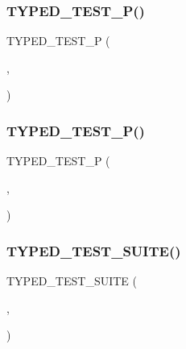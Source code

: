 \subsubsection{\texorpdfstring{TYPED\_TEST\_P()}{TYPED\_TEST\_P()}\hspace{0.1cm}{\footnotesize\ttfamily [1/2]}}
{\footnotesize\ttfamily T\+Y\+P\+E\+D\+\_\+\+T\+E\+S\+T\+\_\+P (\begin{DoxyParamCaption}\item[{\mbox{\hyperlink{class_type_param_test}{Type\+Param\+Test}}}]{,  }\item[{TestA}]{ }\end{DoxyParamCaption})}

\mbox{\label{googletest-master_2googletest_2test_2googletest-list-tests-unittest___8cc_a667494b5b0e4418064679f58c546db97}} 
\subsubsection{\texorpdfstring{TYPED\_TEST\_P()}{TYPED\_TEST\_P()}\hspace{0.1cm}{\footnotesize\ttfamily [2/2]}}
{\footnotesize\ttfamily T\+Y\+P\+E\+D\+\_\+\+T\+E\+S\+T\+\_\+P (\begin{DoxyParamCaption}\item[{\mbox{\hyperlink{class_type_param_test}{Type\+Param\+Test}}}]{,  }\item[{TestB}]{ }\end{DoxyParamCaption})}

\mbox{\label{googletest-master_2googletest_2test_2googletest-list-tests-unittest___8cc_a346de8e681bc95011fed254a54e30205}} 
\subsubsection{\texorpdfstring{TYPED\_TEST\_SUITE()}{TYPED\_TEST\_SUITE()}}
{\footnotesize\ttfamily T\+Y\+P\+E\+D\+\_\+\+T\+E\+S\+T\+\_\+\+S\+U\+I\+TE (\begin{DoxyParamCaption}\item[{\mbox{\hyperlink{class_typed_test}{Typed\+Test}}}]{,  }\item[{\mbox{\hyperlink{googletest-master_2googletest_2test_2googletest-list-tests-unittest___8cc_a16f58cd49c18568802322bbaf9f3f654}{My\+Types}}}]{ }\end{DoxyParamCaption})}

